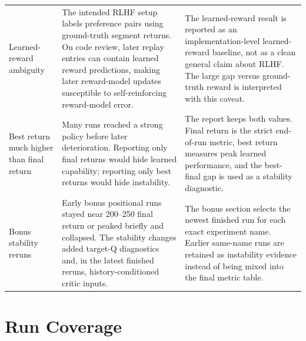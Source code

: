 \documentclass[11pt]{article}
\begin{document}
\begin{table}[!htbp]
{\begin{tabular}{p{}p{}p{}}
Learned-reward ambiguity & The intended RLHF setup labels preference pairs using ground-truth segment returns. On code review, later replay entries can contain learned reward predictions, making later reward-model updates susceptible to self-reinforcing reward-model error. & The learned-reward result is reported as an implementation-level learned-reward baseline, not as a clean general claim about RLHF. The large gap versus ground-truth reward is interpreted with this caveat. \\
Best return much higher than final return & Many runs reached a strong policy before later deterioration. Reporting only final returns would hide learned capability; reporting only best returns would hide instability. & The report keeps both values. Final return is the strict end-of-run metric, best return measures peak learned performance, and the best-final gap is used as a stability diagnostic. \\
Bonus stability reruns & Early bonus positional runs stayed near 200--250 final return or peaked briefly and collapsed. The stability changes added target-Q diagnostics and, in the latest finished reruns, history-conditioned critic inputs. & The bonus section selects the newest finished run for each exact experiment name. Earlier same-name runs are retained as instability evidence instead of being mixed into the final metric table. \\
\bottomrule
\end{tabular}
}
\end{table}

\section{Run Coverage}
\end{document}
